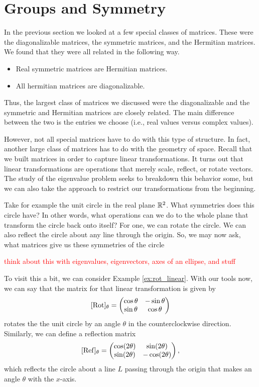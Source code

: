         \section{Groups and Symmetry}
            In the previous section we looked at a few special classes of matrices. These were the diagonalizable matrices, the symmetric matrices, and the Hermitian matrices.  We found that they were all related in the following way.
            \begin{itemize}
                \item Real symmetric matrices are Hermitian matrices.
                \item All hermitian matrices are diagonalizable.
            \end{itemize}
            Thus, the largest class of matrices we discussed were the diagonalizable and the symmetric and Hermitian matrices are closely related. The main difference between the two is the entries we choose (i.e., real values versus complex values).  
            
            However, not all special matrices have to do with this type of structure.  In fact, another large class of matrices has to do with the geometry of space.  Recall that we built matrices in order to capture linear transformations.  It turns out that linear transformations are operations that merely scale, reflect, or rotate vectors. The study of the eigenvalue problem seeks to breakdown this behavior some, but we can also take the approach to restrict our transformations from the beginning.
            
            Take for example the unit circle in the real plane $\mathbb{R}^2$. What symmetries does this circle have? In other words, what operations can we do to the whole plane that transform the circle back onto itself? For one, we can rotate the circle. We can also reflect the circle about any line through the origin. So, we may now ask, what matrices give us these symmetries of the circle
            
            \textcolor{red}{think about this with eigenvalues, eigenvectors, axes of an ellipse, and stuff}
            
            To visit this a bit, we can consider Example \ref{ex:rot_linear}. With our tools now, we can say that the matrix for that linear transformation is given by
            \[
            [\mathrm{Rot}]_\theta = \begin{pmatrix} \cos \theta & -\sin \theta \\ \sin \theta & \cos \theta \end{pmatrix}
            \]
            rotates the the unit circle by an angle $\theta$ in the counterclockwise direction.  Similarly, we can define a reflection matrix
            \[
            [\mathrm{Ref}]_\theta = \begin{pmatrix} \cos (2\theta) & \sin(2\theta) \\ \sin (2\theta) & -\cos(2\theta)\end{pmatrix},
            \]
            which reflects the circle about a line $L$ passing through the origin that makes an angle $\theta$ with the $x$-axis.
            

